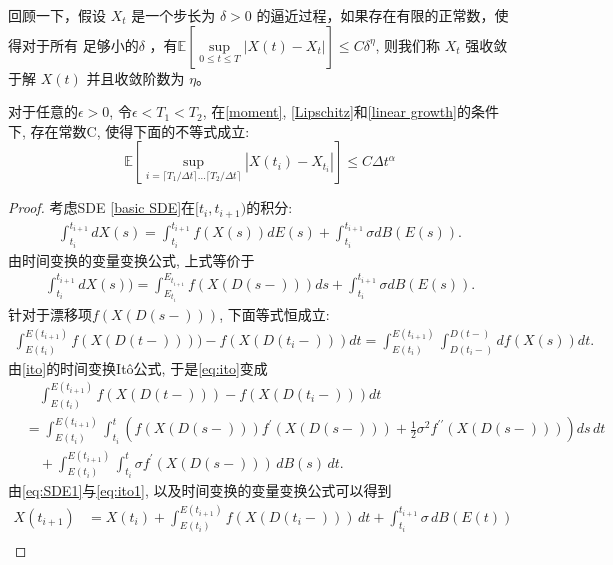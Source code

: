 回顾一下，假设 \( X_t\) 是一个步长为 \( \delta > 0 \) 的逼近过程，如果存在有限的正常数，使得对于所有 足够小的\( \delta \) ，有$\mathbb{E} \left[\sup\limits_{0\le t \le T}|X(t) - X_t|\right] \leq C\delta^{\eta}$, 则我们称 \( X_t \) 强收敛于解 \( X(t) \) 并且收敛阶数为 \( \eta \)。

\begin{theorem}\label{main th EM}
	对于任意的$\epsilon>0$, 令$\epsilon < T_1 < T_2$, 在\textnormal{\cref{moment}}, \textnormal{\cref{Lipschitz}}和\cref{linear growth}的条件下, 存在常数C, 使得下面的不等式成立:
	$$\mathbb{E}\left[\sup\limits_{i=\lceil T_1/\Delta t \rceil\ldots \lceil T_2/\Delta t \rceil } |X({t_i})-X_{t_i}|\right]\le C\Delta t^\alpha$$
\end{theorem}
\begin{proof}
	
	考虑SDE \eqref{basic SDE}在$[t_i, t_{i+1})$的积分:
	\begin{align}
		\int_{t_i}^{t_{i+1}}dX(s)=\int_{t_i}^{t_{i+1}}f(X(s))dE(s)+\int_{t_i}^{t_{i+1}}\sigma dB(E(s)). 
	\end{align}
	由时间变换的变量变换公式\cite{kobayashi2011stochastic}, 上式等价于
	\begin{align}\label{eq:4}
		\int_{t_i}^{t_{i+1}}dX(s))=\int_{E_{t_i}}^{E_{t_{i+1}}}f(X(D(s-)))ds+\int_{t_i}^{t_{i+1}}\sigma dB(E(s)). 
	\end{align}
	针对于漂移项$f(X(D(s-)))$, 下面等式恒成立:
	\begin{align}\label{eq:ito}
		\int_{E(t_i)}^{E(t_{i+1})} f(X(D(t-)))) - f(X(D(t_i-))) dt = \int_{E(t_i)}^{E(t_{i+1})} \int^{D(t-)}_{D(t_i-)} df(X(s)) dt. 
	\end{align}
	由\cref{ito}的时间变换It\^{o}公式, 于是\eqref{eq:ito}变成
	\begin{equation}\label{eq:ito1}
		\begin{aligned}
			&\quad\int_{E(t_i)}^{E(t_{i+1})} f(X(D(t-))) - f(X(D(t_i-))) dt \\
			&= \int_{E(t_i)}^{E(t_{i+1})} \int_{t_i}^{t} \left( f(X(D(s-))) f^{\prime}(X(D(s-))) + \frac{1}{2} \sigma^2 f^{\prime\prime}(X(D(s-))) \right) ds \, dt\\
			&\quad + \int_{E(t_i)}^{E(t_{i+1})} \int_{t_i}^{t} \sigma f^{\prime}(X(D(s-))) \, dB(s) \, dt . 
		\end{aligned}
	\end{equation}
	由\eqref{eq:SDE1}与\eqref{eq:ito1}, 以及时间变换的变量变换公式可以得到
	\begin{align*}
		X(t_{i+1}) 
		&= X(t_i) + \int_{E(t_i)}^{E(t_{i+1})} f(X({D(t_i-)})) \, dt + \int_{t_i}^{t_{i+1}} \sigma \, dB(E(t)) \\

\end{align*}
\end{proof}
